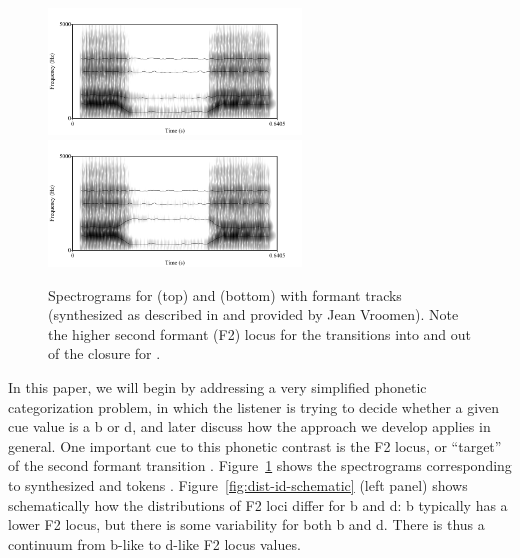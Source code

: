 \begin{figure}[htb]
  \centering
  \includegraphics[width=0.6\textwidth]{figs/vroomen-aba-spectrogram-tracks.pdf}
  \includegraphics[width=0.6\textwidth]{figs/vroomen-ada-spectrogram-tracks.pdf}
  \caption{Spectrograms for  (top) and  (bottom) with formant tracks (synthesized as described in \protect{} and provided by Jean Vroomen).  Note the higher second formant (F2) locus for the transitions into and out of the closure for .}
  \label{fig:aba-ada-spectrograms}
\end{figure}

In this paper, we will begin by addressing a very simplified phonetic categorization problem, in which the listener is trying to decide whether a given cue value is a \ph b or \ph d, and later discuss how the approach we develop applies in general.
One important cue to this phonetic contrast is the F2 locus, or ``target'' of the second formant transition \cite{Delattre1955}.  Figure~\ref{fig:aba-ada-spectrograms} shows the spectrograms corresponding to synthesized  and  tokens \autocite[synthesized by][]{Vroomen2004}.  Figure~\ref{fig:dist-id-schematic} (left panel) shows schematically how the distributions of F2 loci differ for \ph b and \ph d: \ph b typically has a lower F2 locus, but there is some variability for both \ph b and \ph d.  There is thus a continuum from \ph b-like to \ph d-like F2 locus values.

